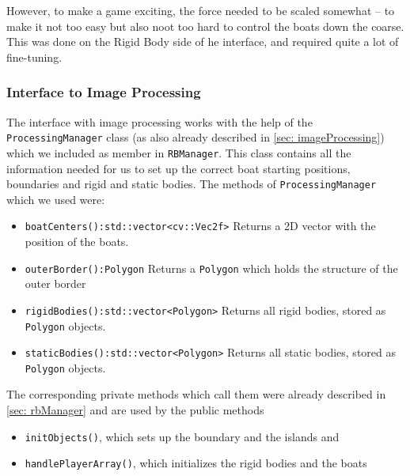 However, to make a game exciting, the force needed to be scaled somewhat -- to make it not too easy but also noot too hard to control the boats down the coarse. This was done on the Rigid Body side of he interface, and required quite a lot of fine-tuning. 

%

\subsubsection{Interface to Image Processing}
\label{sec: interfaceImageProcessing}
The interface with image processing works with the help of the \texttt{ProcessingManager} class (as also already described in \autoref{sec: imageProcessing}) which we included as member in \texttt{RBManager}. This class contains all the information needed for us to set up the correct boat starting positions, boundaries and rigid and static bodies. The methods of \texttt{ProcessingManager} which we used were:
\begin{itemize}
\item \texttt{boatCenters():std::vector<cv::Vec2f>} Returns a 2D vector with the position of the boats.
\item \texttt{outerBorder():Polygon} Returns a \texttt{Polygon} which holds the structure of the outer border
\item \texttt{rigidBodies():std::vector<Polygon>} Returns all rigid bodies, stored as \texttt{Polygon} objects.
\item \texttt{staticBodies():std::vector<Polygon>} Returns all static bodies, stored as \texttt{Polygon} objects.
\end{itemize} 
The corresponding private methods which call them were already described in \autoref{sec: rbManager} and are used by the public methods
\begin{itemize}
\item \texttt{initObjects()}, which sets up the boundary and the islands and
\item \texttt{handlePlayerArray()}, which initializes the rigid bodies and the boats
\end{itemize}
